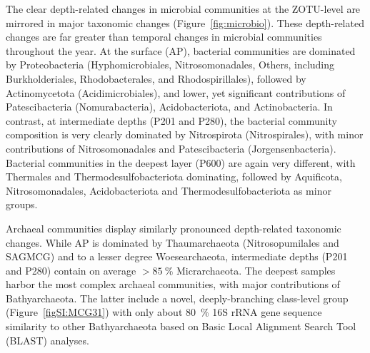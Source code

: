 The clear depth-related changes in microbial communities at the ZOTU-level are mirrored in major taxonomic changes (Figure~\ref{fig:microbio}).
These depth-related changes are far greater than temporal changes in microbial communities throughout the year.
At the surface (AP), bacterial communities are dominated by Proteobacteria (Hyphomicrobiales, Nitrosomonadales, Others, including Burkholderiales, Rhodobacterales, and Rhodospirillales), followed by Actinomycetota (Acidimicrobiales), and lower, yet significant contributions of Patescibacteria (Nomurabacteria), Acidobacteriota, and Actinobacteria.
In contrast, at intermediate depths (P201 and P280), the bacterial community composition is very clearly dominated by Nitrospirota (Nitrospirales), with minor contributions of Nitrosomonadales and Patescibacteria (Jorgensenbacteria).
Bacterial communities in the deepest layer (P600) are again very different, with Thermales and Thermodesulfobacteriota dominating, followed by Aquificota, Nitrosomonadales, Acidobacteriota and Thermodesulfobacteriota as minor groups.

Archaeal communities display similarly pronounced depth-related taxonomic changes.
While AP is dominated by Thaumarchaeota (Nitrosopumilales and SAGMCG) and to a lesser degree Woesearchaeota, intermediate depths (P201 and P280) contain on average $> \SI{85}{\percent}$ Micrarchaeota.
The deepest samples harbor the most complex archaeal communities, with major contributions of Bathyarchaeota.
The latter include a novel, deeply-branching class-level group (Figure~\ref{figSI:MCG31}) with only about \SI{80}{\percent} 16S rRNA gene sequence similarity to other Bathyarchaeota based on Basic Local Alignment Search Tool (BLAST) analyses. 

